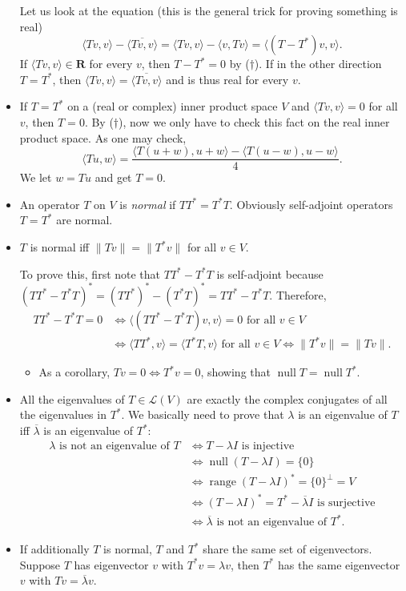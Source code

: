 \documentclass[11pt]{article}
\newcommand{\df}[1]{\textit{\textsf{#1}}}
\newcommand{\R}{\mathbf{R}}
\newcommand{\n}{\operatorname{null}}
\renewcommand{\r}{\operatorname{range}}
\newcommand{\conj}[1]{\overline{#1}}
\newcommand{\inp}[2]{\langle #1, #2 \rangle}
\newcommand{\nm}[1]{\lVert #1 \rVert}
\newcommand{\LV}{\mathcal{L}(V)}
\begin{document}
\begin{itemize}
    Let us look at the equation (this is the general trick for proving something is real)
    $$\inp{Tv}{v}-\conj{\inp{Tv}{v}}=\inp{Tv}{v}-\inp{v}{Tv}=\inp{(T-T^*)v}{v}.$$ If $\inp{Tv}{v} \in \R$ for every $v$, then $T-T^*=0$ by ($\dagger$). If in the other direction $T=T^*$, then $\inp{Tv}{v}=\conj{\inp{Tv}{v}}$ and is thus real for every $v$.
    \item If $T = T^*$ on a (real or complex) inner product space $V$ and $\inp{Tv}{v}=0$ for all $v$, then $T = 0$. By ($\dagger$), now we only have to check this fact on the real inner product space. As one may check, $$\inp{Tu}{w} = \frac{\inp{T(u+w)}{u+w}-\inp{T(u-w)}{u-w}}{4}.$$ We let $w = Tu$ and get $T = 0$.
    \item An operator $T$ on $V$ is \df{normal} if $TT^* = T^*T$. Obviously self-adjoint operators $T = T^*$ are normal.
    \item $T$ is normal iff $\nm{Tv}=\nm{T^*v}$ for all $v \in V$.
    
    To prove this, first note that $TT^* - T^*T$ is self-adjoint because $(TT^*-T^*T)^*=(TT^*)^*-(T^*T)^*=TT^* - T^*T$. Therefore,
    \begin{align*}
        TT^*-T^*T=0 & \iff \inp{(TT^*-T^*T)v}{v}=0 \text{ for all } v \in V \\ & \iff \inp{TT^*}{v} = \inp{T^*T}{v} \text{ for all } v \in V \iff \nm{T^*v}=\nm{Tv}.
    \end{align*}
    \begin{itemize}
        \item As a corollary, $Tv = 0 \iff T^*v = 0$, showing that $\n T = \n T^*$.
    \end{itemize}
    \item All the eigenvalues of $T \in \LV$ are exactly the complex conjugates of all the eigenvalues in $T^*$. We basically need to prove that $\lambda$ is an eigenvalue of $T$ iff $\conj{\lambda}$ is an eigenvalue of $T^*$:
    \begin{align*}
        \lambda \text{ is not an eigenvalue of } T & \iff T - \lambda I \text{ is injective} \\ & \iff \n (T-\lambda I) = \{0\} \\ & \iff \r (T-\lambda I)^* = \{0\}^\perp = V \\ & \iff (T-\lambda I)^* = T^* - \conj{\lambda} I \text{ is surjective} \\ & \iff \conj{\lambda} \text{ is not an eigenvalue of $T^*$}.
    \end{align*}
    \item If additionally $T$ is normal, $T$ and $T^*$ share the same set of eigenvectors. Suppose $T$ has eigenvector $v$ with $T^*v = \lambda v$, then $T^*$ has the same eigenvector $v$ with $Tv = \conj{\lambda}v$.
    

\end{itemize}
\end{document}
